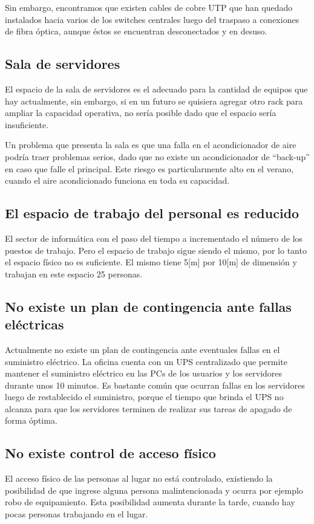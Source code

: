\documentclass[a4paper,11pt,oneside]{article}
\begin{document}
Sin embargo, encontramos que existen cables de cobre UTP que han
quedado instalados hacia varios de los switches centrales luego del
traspaso a conexiones de fibra óptica, aunque éstos se encuentran
desconectados y en desuso.
%
\subsection*{Sala de servidores}
El espacio de la sala de servidores es el adecuado para la cantidad de
equipos que hay actualmente, sin embargo, si en un futuro se quisiera
agregar otro rack para ampliar la capacidad operativa, no sería
posible dado que el espacio sería insuficiente.

Un problema que presenta la sala es que una falla en el acondicionador
de aire podría traer problemas serios, dado que no existe un
acondicionador de ``back-up'' en caso que falle el principal. Este
riesgo es particularmente alto en el verano, cuando el aire
acondicionado funciona en toda su capacidad.
%
\subsection*{El espacio de trabajo del personal es reducido}
El sector de informática con el paso del tiempo a incrementado el
número de los puestos de trabajo. Pero el espacio de trabajo sigue
siendo el mismo, por lo tanto el espacio físico no es suficiente. El
mismo tiene 5[m] por 10[m] de dimensión y trabajan en este espacio 25
personas.
%
\subsection*{No existe un plan de contingencia ante fallas eléctricas}
Actualmente no existe un plan de contingencia ante eventuales fallas
en el suministro eléctrico. La oficina cuenta con un UPS centralizado
que permite mantener el suministro eléctrico en las PCs de los
usuarios y los servidores durante unos 10 minutos. Es bastante común
que ocurran fallas en los servidores luego de restablecido el
suministro, porque el tiempo que brinda el UPS no alcanza para que los
servidores terminen de realizar sus tareas de apagado de forma óptima.
%
\subsection*{No existe control de acceso físico}
El acceso físico de las personas al lugar no está controlado,
existiendo la posibilidad de que ingrese alguna persona
malintencionada y ocurra por ejemplo robo de equipamiento. Esta
posibilidad aumenta durante la tarde, cuando hay pocas personas
trabajando en el lugar.
\end{document}
